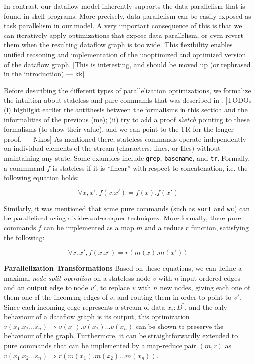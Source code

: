 \documentclass[sigplan,10pt,review,anonymous]{acmart}
\newcommand{\heading}[1]{\vspace{4pt}\noindent\textbf{#1}\enspace}
\newcommand{\ttt}[1]{\texttt{\small #1}}
\newcommand{\nv}[1]{[{\color{cyan}#1 --- Nikos}]}
\newcommand{\kk}[1]{[{\color{magenta}#1 --- kk}]}
\begin{document}
In contrast, our dataflow model inherently supports the data
parallelism that is found in shell programs. More precisely, data
parallelism can be easily exposed as task parallelism in our model. A
very important consequence of this is that we can iteratively apply
optimizations that expose data parallelism, or even revert them when
the resulting dataflow graph is too wide. This flexibility enables
unified reasoning and implementation of the unoptimized and optimized
version of the dataflow graph. \kk{This is interesting, and should be
  moved up (or rephrased in the introduction)}

Before describing the different types of parallelization
optimizations, we formalize the intuition about stateless and pure
commands that was described in .
\nv{TODOs
  (i) highlight earlier the antithesis between the formalisms in this section and the informalities of the previous (me);
  (ii) try to add a proof \emph{sketch} pointing to these formalisms (to show their value), and we can point to the TR for the longer proof.
}
%
As mentioned there, stateless commands operate independently on
individual elements of the stream (characters, lines, or files)
without maintaining any state. Some examples include \ttt{grep},
\ttt{basename}, and \ttt{tr}. Formally, a commmand $f$ is stateless if
it is ``linear'' with respect to concatenation, i.e. the following
equation holds:

\[
\forall x, x', f(x.x') = f(x).f(x')
\]

Similarly, it was mentioned that some pure commands (such as
\ttt{sort} and \ttt{wc}) can be parallelized using divide-and-conquer
techniques. More formally, there pure commands $f$ can be implemented
as a map $m$ and a reduce $r$ function, satisfying the following:

\[
\forall x, x', f(x.x') = r(m(x).m(x'))
\]

\heading{Parallelization Transformations}
%
Based on these equations, we can define a maximal \emph{node split
  operation} on a stateless node $v$ with $n$ input ordered edges and
an output edge to node $v'$, to replace $v$ with $n$ new nodes, giving
each one of them one of the incoming edges of $v$, and routing them in
order to point to $v'$. Since each incoming edge represents a stream
of data $x_i : D^*$, and the only behaviour of a dataflow graph is its
output, this optimization $ v(x_1.x_2...x_n) \Rightarrow
v(x_1).v(x_2)...v(x_n)$ can be shown to preserve the behaviour of the
graph. Furthermore, it can be straightforwardly extended to pure
commands that can be implemented by a map-reduce pair $(m, r)$ as $
v(x_1.x_2...x_n) \Rightarrow r(m(x_1).m(x_2)...m(x_n))$.
\end{document}
